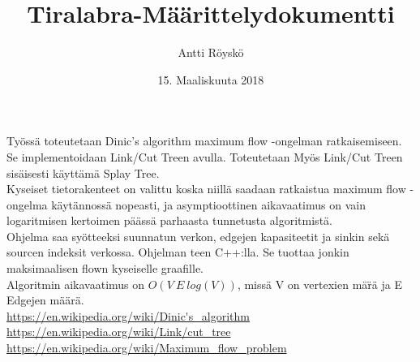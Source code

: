 \documentclass{article}
\title{Tiralabra-M\"a\"arittelydokumentti}
\author{Antti R\"oysk\"o}
\date{15. Maaliskuuta 2018}
\begin{document}
\maketitle

\noindent
Ty\"oss\"a toteutetaan Dinic's algorithm maximum flow -ongelman ratkaisemiseen. Se implementoidaan Link/Cut Treen avulla. Toteutetaan My\"os Link/Cut Treen sis\"aisesti k\"aytt\"am\"a Splay Tree. \\

\noindent
Kyseiset tietorakenteet on valittu koska niill\"a saadaan ratkaistua maximum flow -ongelma k\"ayt\"annoss\"a nopeasti, ja asymptioottinen aikavaatimus on vain logaritmisen kertoimen p\"a\"ass\"a parhaasta tunnetusta algoritmist\"a. \\

\noindent
Ohjelma saa sy\"otteeksi suunnatun verkon, edgejen kapasiteetit ja sinkin sek\"a sourcen indeksit verkossa. Ohjelman teen C++:lla. Se tuottaa jonkin maksimaalisen flown kyseiselle graafille.\\

\noindent
Algoritmin aikavaatimus on $O(V\ E\ log(V))$, miss\"a V on vertexien m\"a\"r\"a ja E Edgejen m\"a\"ar\"a.\\

\noindent
\url{https://en.wikipedia.org/wiki/Dinic's_algorithm}\\
\url{https://en.wikipedia.org/wiki/Link/cut_tree}\\
\url{https://en.wikipedia.org/wiki/Maximum_flow_problem}\\
\end{document}
